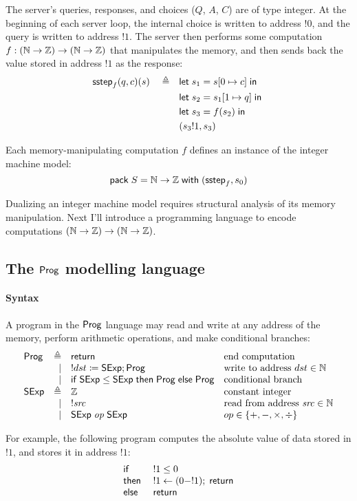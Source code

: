 The server's queries, responses, and choices ($Q$, $A$, $C$) are of type integer.
At the beginning of each server loop, the internal choice is written to address
$!0$, and the query is written to address $!1$.  The server then performs some
computation $f:(\mathbb N\to\mathbb Z)\to(\mathbb N\to\mathbb Z)$ that manipulates the memory, and
then sends back the value stored in address $!1$ as the response:
\begin{align*}
  \mathsf{sstep}_f(q,c)(s)\quad\triangleq\quad&\mathsf{let}\; s_1=s[0\mapsto c]\;\mathsf{in}\;\\
  &\mathsf{let}\; s_2=s_1[1\mapsto q]\;\mathsf{in}\;\\
  &\mathsf{let}\; s_3=f(s_2)\;\mathsf{in}\;\\
  &(s_3!1,s_3)
\end{align*}

Each memory-manipulating computation $f$ defines an instance of the integer
machine model:
\[\mathsf{pack}\;S=\mathbb N\to\mathbb Z\;\mathsf{with}\;(\mathsf{sstep}_f,s_0)\]

Dualizing an integer machine model requires structural analysis of its memory
manipulation.  Next I'll introduce a programming language to encode computations
$(\mathbb N\to\mathbb Z)\to(\mathbb N\to\mathbb Z)$.

\subsection{The $\mathsf{Prog}$ modelling language}
\label{sec:prog-lang}
\paragraph{Syntax}
A program in the $\mathsf{Prog}$ language may read and write at any address of the
memory, perform arithmetic operations, and make conditional branches:
\[\begin{array}{lrll}
\Prog&\triangleq&\Return&\text{end computation}\\
&\mid&!dst\coloneqq\Sexp;\Prog&\text{write to address }dst\in\Nat\\\null
&\mid&\If\Sexp\le\Sexp\Then\Prog\Else\Prog&\text{conditional branch}\\
\Sexp&\triangleq&\Int&\text{constant integer}\\
&\mid&!\src&\text{read from address }\src\in\Nat\\
&\mid&\Sexp\oop\Sexp&op\in\{+,-,\times,\div\}
\end{array}\]

For example, the following program computes the absolute value of data stored in
$!1$, and stores it in address $!1$:
\[\begin{array}{ll}
  \mathsf{if}\;&!1\le0\\
  \mathsf{then}\;&!1\gets(0-!1);\;\mathsf{return}\\
  \mathsf{else}\;&\mathsf{return}
\end{array}\]

